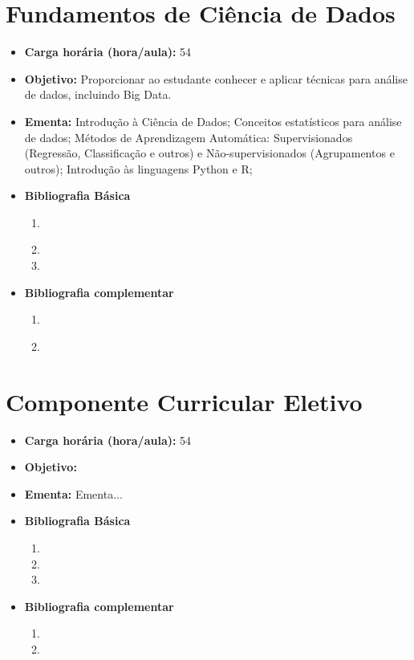\documentclass[
	10pt,				%
	openright,			%
	twoside,			%
	a4paper,			%
	english,			%
	french,				%
	brazil,				%
	sumario=tradicional
]{abntex2}
\begin{document}
\section*{Fundamentos de Ciência de Dados}\label{6_datascience}
\begin{itemize}
	\item \textbf{Carga horária (hora/aula):} 54
	\item \textbf{Objetivo:} Proporcionar ao estudante conhecer e aplicar técnicas para análise de dados, incluindo Big Data.
	\item \textbf{Ementa:} 
	Introdução à Ciência de Dados;
	Conceitos estatísticos para análise de dados;
	Métodos de Aprendizagem Automática: Supervisionados (Regressão, Classificação e outros) e Não-supervisionados (Agrupamentos e outros);
	Introdução às linguagens Python e R;
	\item \textbf{Bibliografia Básica}
	\begin{enumerate}
		\item \cite{barbetta2004estatistica}
		\item 
		\item 
	\end{enumerate}
	\item \textbf{Bibliografia complementar}
	\begin{enumerate}
		\item \cite{farberestatistica}
		\item
	\end{enumerate} 	
\end{itemize}


\newpage
\section*{Componente Curricular Eletivo}\label{6_opta}
\begin{itemize}
	\item \textbf{Carga horária (hora/aula):} 54
	\item \textbf{Objetivo:} 
	\item \textbf{Ementa:} 
	Ementa...
	\item \textbf{Bibliografia Básica}
	\begin{enumerate}
		\item 
		\item 
		\item 
	\end{enumerate}
	\item \textbf{Bibliografia complementar}
	\begin{enumerate}
		\item 
		\item
	\end{enumerate} 	
\end{itemize}
\end{document}
